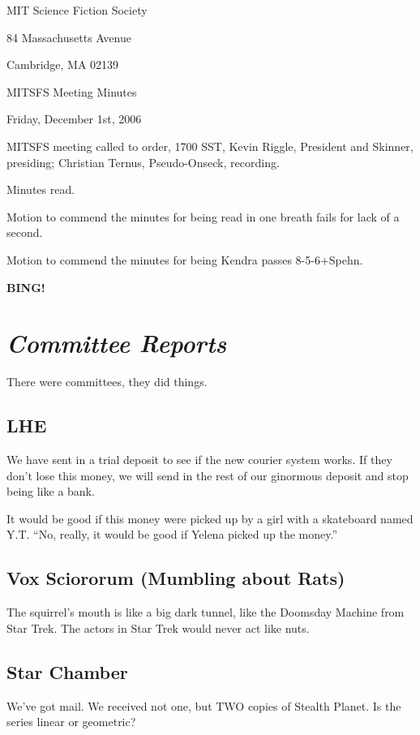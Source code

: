 \documentclass[10pt]{article}
\newcommand{\bing}{{\bf BING!} }
\newcommand{\goto}[1]{\bing \vskip 12pt \section*{{\em{#1}}}}
\begin{document}
\begin{center}

MIT Science Fiction Society

84 Massachusetts Avenue

Cambridge, MA 02139

\vspace{12pt}

MITSFS Meeting Minutes

Friday, December 1st, 2006

\end{center}

\vspace{18pt}

\setlength{\parskip}{6pt}

\noindent
MITSFS meeting called to order, 1700 SST,
Kevin Riggle, President and Skinner, presiding; Christian Ternus, Pseudo-Onseck, recording.

Minutes read.

Motion to commend the minutes for being read in one breath fails for lack of a second.

Motion to commend the minutes for being Kendra passes 8-5-6+Spehn.

\goto{Committee Reports}

There were committees, they did things.

\subsection*{LHE}
We have sent in a trial deposit to see if the new courier system works. If they don't lose this money, we will send in the rest of our ginormous deposit and stop being like a bank.

It would be good if this money were picked up by a girl with a skateboard named Y.T. ``No, really, it would be good if Yelena picked up the money.''

\subsection*{Vox Sciororum (Mumbling about Rats)}
The squirrel's mouth is like a big dark tunnel, like the Doomsday Machine from Star Trek. The actors in Star Trek would never act like nuts.

\subsection*{Star Chamber}
We've got mail. We received not one, but TWO copies of Stealth Planet. Is the series linear or geometric?
\end{document}
